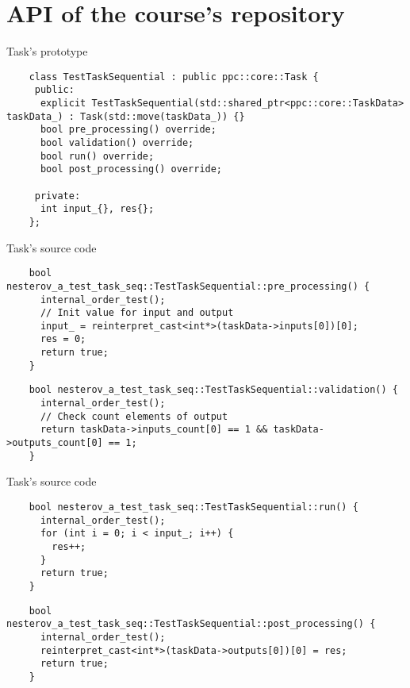 \documentclass{beamer}
\begin{document}
\section{API of the course's repository}

\begin{frame}[fragile]{Task's prototype}
  \lstset{style=CStyle, caption=include/ops\_seq.hpp}
  \begin{lstlisting}
    class TestTaskSequential : public ppc::core::Task {
     public:
      explicit TestTaskSequential(std::shared_ptr<ppc::core::TaskData> taskData_) : Task(std::move(taskData_)) {}
      bool pre_processing() override;
      bool validation() override;
      bool run() override;
      bool post_processing() override;
    
     private:
      int input_{}, res{};
    };
  \end{lstlisting}
\end{frame}

\begin{frame}[fragile]{Task's source code}
  \lstset{style=CStyle, caption=src/ops\_seq.cpp | pre\_processing}
  \begin{lstlisting}
    bool nesterov_a_test_task_seq::TestTaskSequential::pre_processing() {
      internal_order_test();
      // Init value for input and output
      input_ = reinterpret_cast<int*>(taskData->inputs[0])[0];
      res = 0;
      return true;
    }
  \end{lstlisting}

  \lstset{style=CStyle, caption=src/ops\_seq.cpp | validation}
  \begin{lstlisting}
    bool nesterov_a_test_task_seq::TestTaskSequential::validation() {
      internal_order_test();
      // Check count elements of output
      return taskData->inputs_count[0] == 1 && taskData->outputs_count[0] == 1;
    }
  \end{lstlisting}
\end{frame}

\begin{frame}[fragile]{Task's source code}
  \lstset{style=CStyle, caption=src/ops\_seq.cpp | run}
  \begin{lstlisting}
    bool nesterov_a_test_task_seq::TestTaskSequential::run() {
      internal_order_test();
      for (int i = 0; i < input_; i++) {
        res++;
      }
      return true;
    }
  \end{lstlisting}

  \lstset{style=CStyle, caption=src/ops\_seq.cpp | post\_processing}
  \begin{lstlisting}
    bool nesterov_a_test_task_seq::TestTaskSequential::post_processing() {
      internal_order_test();
      reinterpret_cast<int*>(taskData->outputs[0])[0] = res;
      return true;
    }
  \end{lstlisting}
\end{frame}
\end{document}
